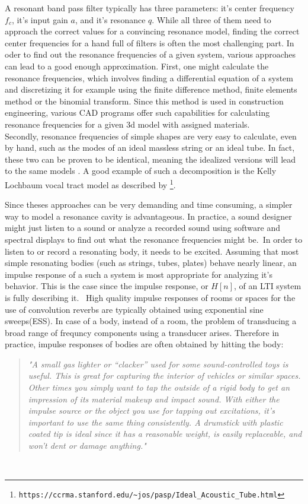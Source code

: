 A resonant band pass filter typically has three parameters: it's center frequency \(f_c\), it's input gain \(a\), and it's resonance \(q\). While all three of them need to approach the correct values for a convincing resonance model, finding the correct center frequencies for a hand full of filters is often the most challenging part. In oder to find out the resonance frequencies of a given system, various approaches can lead to a good enough approximation. First, one might calculate the resonance frequencies, which involves finding a differential equation of a system and discretizing it for example using the finite difference method, finite elements method or the binomial transform. Since this method is used in construction engineering, various CAD programs offer such capabilities for calculating resonance frequencies for a given 3d model with assigned materials. \\
Secondly, resonance frequencies of simple shapes are very easy to calculate, even by hand, such as the modes of an ideal massless string or an ideal tube. In fact, these two can be proven to be identical, meaning the idealized versions will lead to the same models \citep[see][p. 230]{cook_real_2002}. A good example of such a decomposition is the Kelly Lochbaum vocal tract model as described by \citep{smith_physical_2010}\footnote{\texttt{https://ccrma.stanford.edu/\~{}jos/pasp/Ideal\_Acoustic\_Tube.html}}. 


Since theses approaches can be very demanding and time consuming, a simpler way to model a resonance cavity is advantageous. In practice, a sound designer might just listen to a sound or analyze a recorded sound using software and spectral displays to find out what the resonance frequencies might be.\
In order to listen to or record a resonating body, it needs to be excited. Assuming that most simple resonating bodies (such as strings, tubes, plates) behave nearly linear, an impulse response of a such a system is most appropriate for analyzing it's behavior. This is the case since the impulse response, or \(H[n]\), of an LTI system is fully describing it. \
High quality impulse responses of rooms or spaces for the use of convolution reverbs are typically obtained using exponential sine sweeps(ESS). In case of a body, instead of a room, the problem of transducing a broad range of frequncy components using a transducer arises. Therefore in practice, impulse responses of bodies are often obtained by hitting the body:

\begin{quotation}
\textit{"A small gas lighter or “clacker” used for some sound-controlled toys is useful. This is great for capturing the interior of vehicles or similar spaces. Other times you simply want to tap the outside of a rigid body to get an impression of its material makeup and impact sound. With either the impulse source or the object you use for tapping out excitations, it’s important to use the same thing consistently. A drumstick with plastic coated tip is ideal since it has a reasonable weight, is easily replaceable, and won’t dent or damage anything."}
\end{quotation}
\citep[p. 230]{farnell_designing_2010}\

